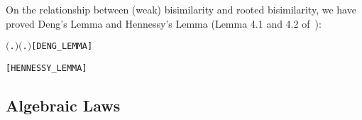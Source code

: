 On the relationship between (weak) bisimilarity and rooted bisimilarity, 
we have proved Deng's Lemma and Hennessy's Lemma
(Lemma 4.1 and 4.2 of~\citep[p.~176,~178]{Gorrieri:2015jt}):
\begin{alltt}
\HOLTokenTurnstile{}  \HOLSymConst{\HOLTokenWeakEQ}  \HOLSymConst{\HOLTokenImp{}} \ensuremath{(}\HOLSymConst{\HOLTokenExists{}}.  \HOLTokenTransBegin\HOLSymConst{\ensuremath{\tau}}\HOLTokenTransEnd {} \HOLSymConst{\HOLTokenConj{}}  \HOLSymConst{\HOLTokenWeakEQ} \ensuremath{)} \HOLSymConst{\HOLTokenDisj{}} \ensuremath{(}\HOLSymConst{\HOLTokenExists{}}.  \HOLTokenTransBegin\HOLSymConst{\ensuremath{\tau}}\HOLTokenTransEnd {} \HOLSymConst{\HOLTokenConj{}}  \HOLSymConst{\HOLTokenWeakEQ} \ensuremath{)} \HOLSymConst{\HOLTokenDisj{}}  \HOLSymConst{\HOLTokenObsCongr} \hfill{[DENG_LEMMA]}
  
\HOLTokenTurnstile{}  \HOLSymConst{\HOLTokenWeakEQ}  \HOLSymConst{\HOLTokenEquiv{}}  \HOLSymConst{\HOLTokenObsCongr}  \HOLSymConst{\HOLTokenDisj{}}  \HOLSymConst{\HOLTokenObsCongr} \HOLSymConst{\ensuremath{\tau}}\HOLSymConst{\ensuremath{\ldotp}} \HOLSymConst{\HOLTokenDisj{}} \HOLSymConst{\ensuremath{\tau}}\HOLSymConst{\ensuremath{\ldotp}} \HOLSymConst{\HOLTokenObsCongr} \hfill{[HENNESSY_LEMMA]}
\end{alltt}

\subsection{Algebraic Laws}

